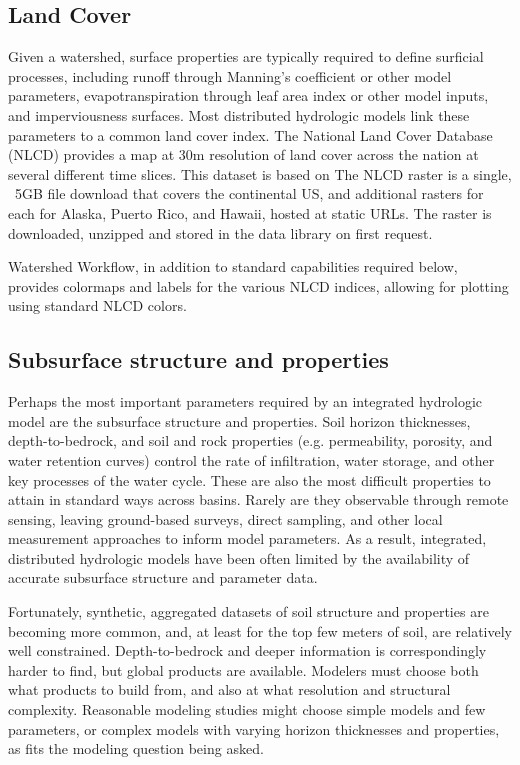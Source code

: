 \documentclass[a4paper,fleqn]{cas-dc}
\newcommand{\note}[1]{\emph{\color{red}{#1}}}
\begin{document}
\subsection{Land Cover}\label{ssc:acquisition:land_cover}
%
Given a watershed, surface properties are typically required to define surficial processes, including runoff through Manning's coefficient or other model parameters, evapotranspiration through leaf area index or other model inputs, and imperviousness surfaces.
Most distributed hydrologic models link these parameters to a common land cover index.
The National Land Cover Database (NLCD)\cite{NLCD} provides a map at 30m resolution of land cover across the nation at several different time slices.
This dataset is based on \note{insert sentence on satallite imagery used, etc.}
The NLCD raster is a single, ~5GB file download that covers the continental US, and additional rasters for each for Alaska, Puerto Rico, and Hawaii, hosted at static URLs.
The raster is downloaded, unzipped and stored in the data library on first request.

Watershed Workflow, in addition to standard capabilities required below, provides colormaps and labels for the various NLCD indices, allowing for plotting using standard NLCD colors.

\note{Additionally, do we want to include MODIS and LAI here?}

\subsection{Subsurface structure and properties}\label{ssc:acquisition:soil}
%
Perhaps the most important parameters required by an integrated hydrologic model are the subsurface structure and properties.
Soil horizon thicknesses, depth-to-bedrock, and soil and rock properties (e.g. permeability, porosity, and water retention curves) control the rate of infiltration, water storage, and other key processes of the water cycle.
These are also the most difficult properties to attain in standard ways across basins.
Rarely are they observable through remote sensing, leaving ground-based surveys, direct sampling, and other local measurement approaches to inform model parameters.
As a result, integrated, distributed hydrologic models have been often limited by the availability of accurate subsurface structure and parameter data.

Fortunately, synthetic, aggregated datasets of soil structure and properties are becoming more common, and, at least for the top few meters of soil, are relatively well constrained.
Depth-to-bedrock and deeper information is correspondingly harder to find, but global products are available.
Modelers must choose both what products to build from, and also at what resolution and structural complexity.
Reasonable modeling studies might choose simple models and few parameters, or complex models with varying horizon thicknesses and properties, as fits the modeling question being asked.
\end{document}
